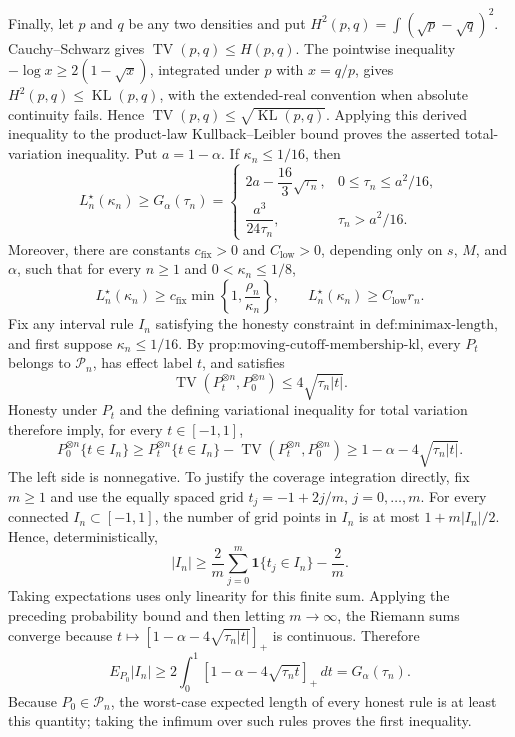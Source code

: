 Finally, let \(p\) and \(q\) be any two densities and put
\(H^2(p,q)=\int(\sqrt p-\sqrt q)^2\).  Cauchy--Schwarz gives
\(\operatorname{TV}(p,q)\le H(p,q)\).  The pointwise inequality
\(-\log x\ge2(1-\sqrt x)\), integrated under \(p\) with \(x=q/p\),
gives \(H^2(p,q)\le\operatorname{KL}(p,q)\), with the extended-real
convention when absolute continuity fails.  Hence
\(\operatorname{TV}(p,q)\le\sqrt{\operatorname{KL}(p,q)}\).  Applying
this derived inequality to the product-law Kullback--Leibler bound proves
the asserted total-variation inequality.
Put \(a=1-\alpha\).  If \(\kappa_n\le1/16\), then
\[
 L_n^\star(\kappa_n)\ge G_\alpha(\tau_n)
 =\begin{cases}
 2a-\dfrac{16}{3}\sqrt{\tau_n},
   &0\le\tau_n\le a^2/16,\\[6pt]
 \dfrac{a^3}{24\tau_n},&\tau_n>a^2/16.
 \end{cases}
\]
Moreover, there are constants \(c_{\mathrm{fix}}>0\) and
\(C_{\mathrm{low}}>0\), depending only on \(s\), \(M\), and
\(\alpha\), such that for every \(n\ge1\) and
\(0<\kappa_n\le1/8\),
\[
 L_n^\star(\kappa_n)
 \ge c_{\mathrm{fix}}\min\left\{1,\frac{\rho_n}{\kappa_n}\right\},
 \qquad
 L_n^\star(\kappa_n)\ge C_{\mathrm{low}}r_n.
\]
Fix any interval rule \(I_n\) satisfying the honesty constraint in
\(\text{def:minimax-length}\), and first suppose \(\kappa_n\le1/16\).
By \(\text{prop:moving-cutoff-membership-kl}\), every \(P_t\) belongs to
\(\mathcal P_n\), has effect label \(t\), and satisfies
\[
 \operatorname{TV}(P_t^{\otimes n},P_0^{\otimes n})
 \le4\sqrt{\tau_n|t|}.
\]
Honesty under \(P_t\) and the defining variational inequality for total
variation therefore imply, for every \(t\in[-1,1]\),
\[
 P_0^{\otimes n}\{t\in I_n\}
 \ge P_t^{\otimes n}\{t\in I_n\}
     -\operatorname{TV}(P_t^{\otimes n},P_0^{\otimes n})
 \ge1-\alpha-4\sqrt{\tau_n|t|}.
\]
The left side is nonnegative.  To justify the coverage integration
directly, fix \(m\ge1\) and use the equally spaced grid
\(t_j=-1+2j/m\), \(j=0,\ldots,m\).  For every connected
\(I_n\subset[-1,1]\), the number of grid points in \(I_n\) is at most
\(1+m|I_n|/2\).  Hence, deterministically,
\[
 |I_n|\ge\frac2m\sum_{j=0}^m\mathbf 1\{t_j\in I_n\}-\frac2m.
\]
Taking expectations uses only linearity for this finite sum.  Applying
the preceding probability bound and then letting \(m\to\infty\), the
Riemann sums converge because
\(t\mapsto[1-\alpha-4\sqrt{\tau_n|t|}]_+\) is continuous.  Therefore
\[
 E_{P_0}|I_n|
 \ge2\int_0^1[1-\alpha-4\sqrt{\tau_nt}]_+\,dt
 =G_\alpha(\tau_n).
\]
Because \(P_0\in\mathcal P_n\), the worst-case expected length of every
honest rule is at least this quantity; taking the infimum over such rules
proves the first inequality.

